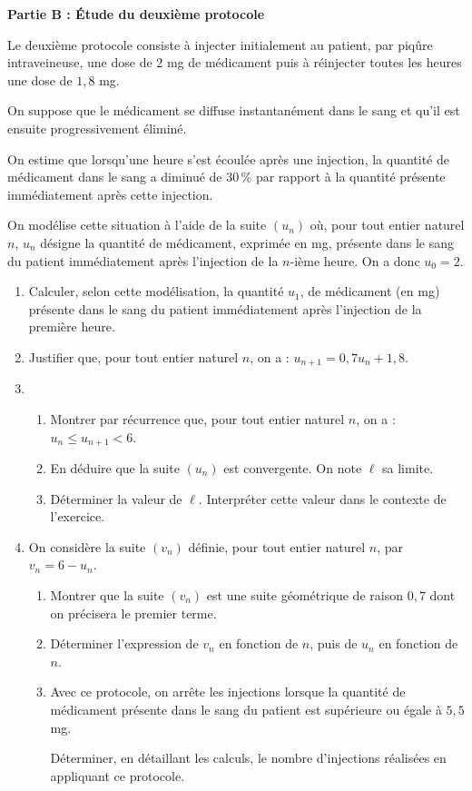 \documentclass[10pt,a4paper]{article}
\begin{document}
\bigskip

\textbf{Partie B : Étude du deuxième protocole}

\medskip

Le deuxième protocole consiste à injecter initialement au patient, par piqûre intraveineuse, une dose de $2$ mg de médicament puis à réinjecter toutes les heures une dose de $1,8$ mg.

On suppose que le médicament se diffuse instantanément dans le sang et qu'il est ensuite
progressivement éliminé.

On estime que lorsqu'une heure s'est écoulée après une injection, la quantité de médicament dans le sang a diminué de 30\,\% par rapport à la quantité présente immédiatement après cette injection.

On modélise cette situation à l'aide de la suite $\left(u_n\right)$ où, pour tout entier naturel $n$, $u_n$ désigne la quantité de médicament, exprimée en mg, présente dans le sang du patient immédiatement après l'injection de la $n$-ième heure. On a donc $u_0 = 2$.

\medskip

\begin{enumerate}
\item Calculer, selon cette modélisation, la quantité $u_1$, de médicament (en mg) présente dans le sang du patient immédiatement après l'injection de la première heure.
\item Justifier que, pour tout entier naturel $n$, on a : $u_{n+1} = 0,7u_n + 1,8$.
\item 
	\begin{enumerate}
		\item Montrer par récurrence que, pour tout entier naturel $n$, on a : $u_n \leqslant u_{n+1}  < 6$.
		\item En déduire que la suite $\left(u_n\right)$ est convergente. On note $\ell$ sa limite.
		\item Déterminer la valeur de $\ell$. Interpréter cette valeur dans le contexte de l'exercice.
	\end{enumerate}	
\item On considère la suite $\left(v_n\right)$ définie, pour tout entier naturel $n$, par $v_n = 6 - u_n$.
	\begin{enumerate}
		\item Montrer que la suite $\left(v_n\right)$ est une suite géométrique de raison $0,7$ dont on précisera le premier terme.
		\item Déterminer l'expression de $v_n$ en fonction de $n$, puis de $u_n$ en fonction de $n$.
		\item Avec ce protocole, on arrête les injections lorsque la quantité de médicament présente dans le sang du patient est supérieure ou égale à $5,5$ mg.

Déterminer, en détaillant les calculs, le nombre d'injections réalisées en appliquant ce protocole.
	\end{enumerate}
\end{enumerate}
\end{document}
